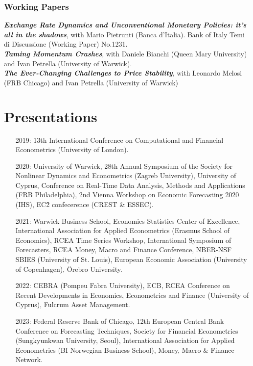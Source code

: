 \documentclass[a4paper,12pt]{article}
\begin{document}
\subsubsection*{Working Papers}
\textit{\textbf{Exchange Rate Dynamics and Unconventional Monetary Policies: it’s all in the shadows}}, with Mario Pietrunti (Banca d'Italia). Bank of Italy Temi di Discussione (Working Paper) No.1231.\\[.5em]
\textit{\textbf{Taming Momentum Crashes}}, with Daniele Bianchi (Queen Mary University) and Ivan Petrella (University of Warwick).\\[.5em]
\textit{\textbf{The Ever-Changing Challenges to Price Stability}}, with Leonardo Melosi (FRB Chicago) and Ivan Petrella (University of Warwick)

\section{Presentations}
\begin{itemize}
    \item[2019:] 13th International Conference on Computational and Financial Econometrics (University of London).
    \item[2020:] University of Warwick, 28th Annual Symposium of the Society for Nonlinear Dynamics and Econometrics (Zagreb University), University of Cyprus, Conference on Real-Time Data Analysis, Methods and Applications (FRB Philadelphia), 2nd Vienna Workshop on Economic Forecasting 2020 (IHS), EC\^2 confecerence (CREST \& ESSEC).
    \item[2021:] Warwick Business School, Economics Statistics Center of Excellence, International Association for Applied Econometrics (Erasmus School of Economics),  RCEA Time Series Workshop, International Symposium of Forecasters,  RCEA Money, Macro and Finance Conference, NBER-NSF SBIES (University of St. Louis), European Economic Association (University of Copenhagen), \"Orebro University.
    \item[2022:] CEBRA (Pompeu Fabra University), ECB, RCEA Conference on Recent Developments in Economics, Econometrics and Finance (University of Cyprus), Fulcrum Asset Management.
    \item[2023:] Federal Reserve Bank of Chicago, 12th European Central Bank Conference on Forecasting Techniques, Society for Financial Econometrics (Sungkyunkwan University, Seoul), International Association for Applied Econometrics (BI Norwegian Business School), Money, Macro \& Finance Network. 
\end{itemize}
\end{document}
